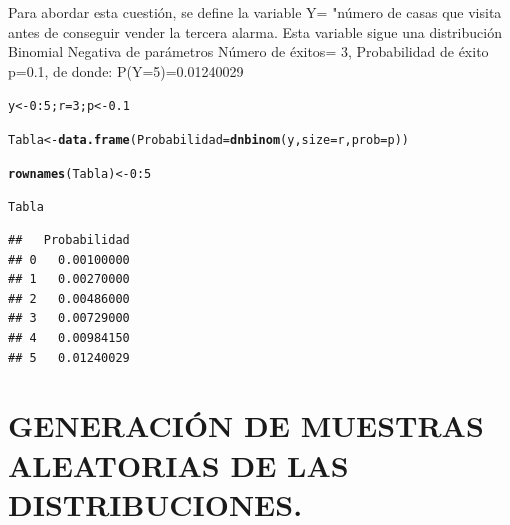 \documentclass[12pt,letterpaper]{article}\usepackage[]{graphicx}\usepackage[]{color}
\makeatletter
\newcommand{\hlnum}[1]{\textcolor[rgb]{0.686,0.059,0.569}{#1}}%
\newcommand{\hlopt}[1]{\textcolor[rgb]{0,0,0}{#1}}%
\newcommand{\hlstd}[1]{\textcolor[rgb]{0.345,0.345,0.345}{#1}}%
\newcommand{\hlkwb}[1]{\textcolor[rgb]{0.69,0.353,0.396}{#1}}%
\newcommand{\hlkwc}[1]{\textcolor[rgb]{0.333,0.667,0.333}{#1}}%
\newcommand{\hlkwd}[1]{\textcolor[rgb]{0.737,0.353,0.396}{\textbf{#1}}}%
\newenvironment{kframe}{%
 \def\at@end@of@kframe{}%
 \ifinner\ifhmode%
  \def\at@end@of@kframe{\end{minipage}}%
  \begin{minipage}{\columnwidth}%
 \fi\fi%
 \def\FrameCommand##1{\hskip\@totalleftmargin \hskip-\fboxsep
 \colorbox{shadecolor}{##1}\hskip-\fboxsep
     \hskip-\linewidth \hskip-\@totalleftmargin \hskip\columnwidth}%
 \MakeFramed {\advance\hsize-\width
   \@totalleftmargin\z@ \linewidth\hsize
   \@setminipage}}%
 {\par\unskip\endMakeFramed%
 \at@end@of@kframe}
\newenvironment{knitrout}{}{} %
\makeatother
\begin{document}
\begin{itemize}
Para abordar esta cuesti\'on, se define la variable Y= "n\'umero de casas que visita antes de conseguir vender la tercera alarma. Esta variable sigue una distribuci\'on Binomial Negativa de par\'ametros N\'umero de \'exitos= 3, Probabilidad de \'exito p=0.1, de donde: P(Y=5)=0.01240029

\begin{knitrout}
\color{fgcolor}\begin{kframe}
\begin{alltt}
\hlstd{y} \hlkwb{<-} \hlnum{0}\hlopt{:}\hlnum{5}\hlstd{; r}\hlkwb{=}\hlnum{3}\hlstd{; p} \hlkwb{<-} \hlnum{0.1}

\hlstd{Tabla} \hlkwb{<-} \hlkwd{data.frame}\hlstd{(}\hlkwc{Probabilidad}\hlstd{=}\hlkwd{dnbinom}\hlstd{(y,} \hlkwc{size}\hlstd{=r,} \hlkwc{prob}\hlstd{=p))}

\hlkwd{rownames}\hlstd{(Tabla)} \hlkwb{<-} \hlnum{0}\hlopt{:}\hlnum{5}

\hlstd{Tabla}
\end{alltt}
\begin{verbatim}
##   Probabilidad
## 0   0.00100000
## 1   0.00270000
## 2   0.00486000
## 3   0.00729000
## 4   0.00984150
## 5   0.01240029
\end{verbatim}
\end{kframe}
\end{knitrout}
\end{itemize}

\section{GENERACI\'ON DE MUESTRAS ALEATORIAS DE LAS DISTRIBUCIONES.}
\end{document}
